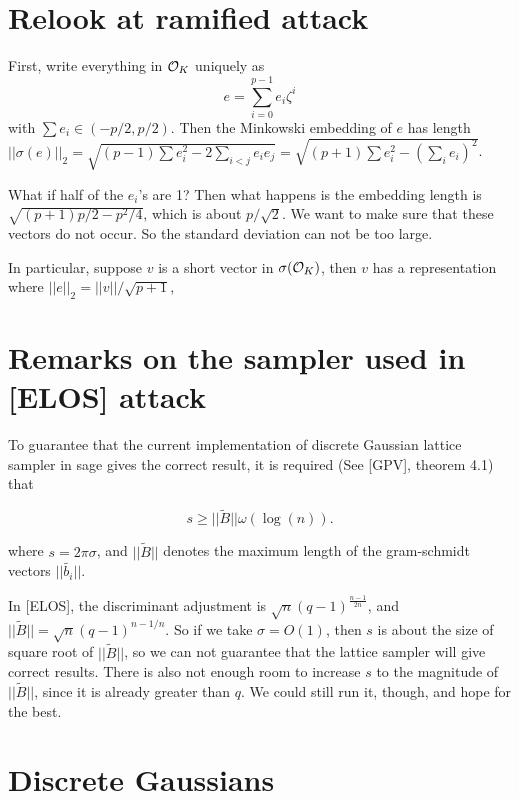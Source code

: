 \documentclass{amsart}
\begin{document}
\section{Relook at ramified attack}

First, write everything in $\mathcal{O}_K$ uniquely as
\[
    e = \sum_{i=0}^{p-1} e_i \zeta^i
\]
with $\sum e_i \in (-p/2, p/2)$.
Then the Minkowski embedding of $e$ has length
$||\sigma(e)||_2 = \sqrt{(p-1)\sum e_i^2 - 2\sum_{i < j} e_i e_j} = \sqrt{(p+1) \sum e_i^2 - (\sum_i e_i)^2}$.

What if half of the $e_i$'s are 1? Then what happens is
the embedding length is $\sqrt{(p+1)p/2 - p^2/4}$, which is about $p/\sqrt{2}$. We want to make sure that these
vectors do not occur. So the standard deviation can not
be too large.


In particular, suppose $v$ is a short vector in  $\sigma(\mathcal{O}_K)$, then $v$ has a representation where
$||e||_2 = ||v||/\sqrt{p+1}$,



\newpage

\section{Remarks on the sampler used in [ELOS] attack}

To guarantee that the current implementation of discrete Gaussian lattice sampler in sage gives the correct result, it is required (See [GPV], theorem 4.1) that

$$s \geq ||\tilde{B}|| \omega(\log(n)).$$

where $s = 2\pi \sigma$, and $||\tilde{B}||$ denotes the maximum length of the gram-schmidt vectors $||\tilde{b_i}||$.

In [ELOS], the discriminant adjustment is $\sqrt{n} (q-1)^{\frac{n-1}{2n}}$, and $||\tilde{B}|| = \sqrt{n}(q-1)^{n-1/n}$. So if we take $\sigma = O(1)$, then $s$ is
about the size of square root of $||\tilde{B}||$, so we can not guarantee that the lattice sampler will give
correct results. There is also not enough room to increase $s$ to the magnitude of $||\tilde{B}||$, since it is already greater than $q$. We could still run it, though, and hope for the best.


\newpage

\section{Discrete Gaussians}
\end{document}
